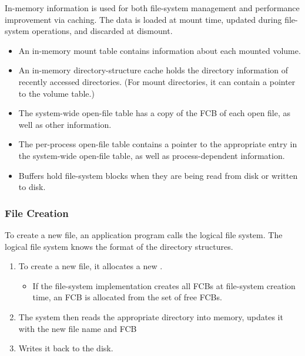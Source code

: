 In-memory information is used for both file-system management and performance improvement via caching.
The data is loaded at mount time, updated during file-system operations, and discarded at dismount.
\begin{itemize}[noitemsep]
\item An in-memory mount table contains information about each mounted volume.
\item An in-memory directory-structure cache holds the directory information of recently accessed directories.
  (For mount directories, it can contain a pointer to the volume table.)
\item The system-wide open-file table has a copy of the FCB of each open file, as well as other information.
\item The per-process open-file table contains a pointer to the appropriate entry in the system-wide open-file table, as well as process-dependent information.
\item Buffers hold file-system blocks when they are being read from disk or written to disk.
\end{itemize}

\subsubsection{File Creation}\label{subsubsec:File_Creation}
To create a new file, an application program calls the logical file system.
The logical file system knows the format of the directory structures.
\begin{enumerate}[noitemsep]
\item To create a new file, it allocates a new .
  \begin{itemize}[noitemsep]
  \item If the file-system implementation creates all FCBs at file-system creation time, an FCB is allocated from the set of free FCBs.
  \end{itemize}
\item The system then reads the appropriate directory into memory, updates it with the new file name and FCB
\item Writes it back to the disk.
\end{enumerate}

